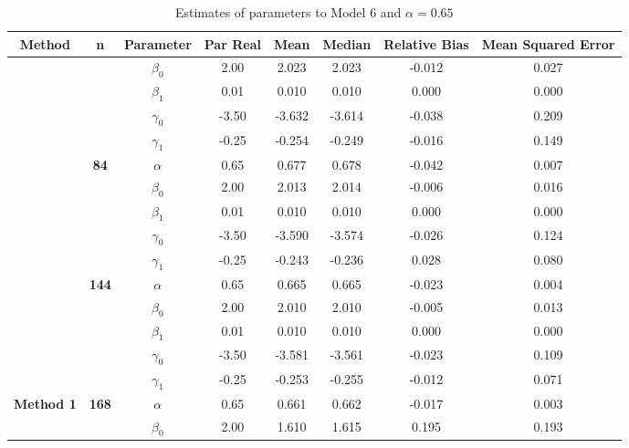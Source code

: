 \begin{table}[h]

\caption{\label{tab:Est_model_6_Alpha0.65}Estimates of parameters to Model 6 and $\alpha=0.65$}
\centering
\begin{tabular}[t]{>{}c>{}ccccccc}
\toprule
Method & n & Parameter & Par Real & Mean & Median & Relative Bias & Mean Squared Error\\
\midrule
 &  & $\beta_0$ & 2.00 & 2.023 & 2.023 & -0.012 & 0.027\\

 &  & $\beta_1$ & 0.01 & 0.010 & 0.010 & 0.000 & 0.000\\

 &  & $\gamma_0$ & -3.50 & -3.632 & -3.614 & -0.038 & 0.209\\

 &  & $\gamma_1$ & -0.25 & -0.254 & -0.249 & -0.016 & 0.149\\

 & \multirow{-5}{*}{\centering\arraybackslash \textbf{84}} & $\alpha$ & 0.65 & 0.677 & 0.678 & -0.042 & 0.007\\

 &  & $\beta_0$ & 2.00 & 2.013 & 2.014 & -0.006 & 0.016\\

 &  & $\beta_1$ & 0.01 & 0.010 & 0.010 & 0.000 & 0.000\\

 &  & $\gamma_0$ & -3.50 & -3.590 & -3.574 & -0.026 & 0.124\\

 &  & $\gamma_1$ & -0.25 & -0.243 & -0.236 & 0.028 & 0.080\\

 & \multirow{-5}{*}{\centering\arraybackslash \textbf{144}} & $\alpha$ & 0.65 & 0.665 & 0.665 & -0.023 & 0.004\\

 &  & $\beta_0$ & 2.00 & 2.010 & 2.010 & -0.005 & 0.013\\

 &  & $\beta_1$ & 0.01 & 0.010 & 0.010 & 0.000 & 0.000\\

 &  & $\gamma_0$ & -3.50 & -3.581 & -3.561 & -0.023 & 0.109\\

 &  & $\gamma_1$ & -0.25 & -0.253 & -0.255 & -0.012 & 0.071\\

\multirow{-15}{*}{\centering\arraybackslash \textbf{Method 1}} & \multirow{-5}{*}{\centering\arraybackslash \textbf{168}} & $\alpha$ & 0.65 & 0.661 & 0.662 & -0.017 & 0.003\\
\cmidrule{1-8}
 &  & $\beta_0$ & 2.00 & 1.610 & 1.615 & 0.195 & 0.193\\


\end{tabular}
\end{table}
